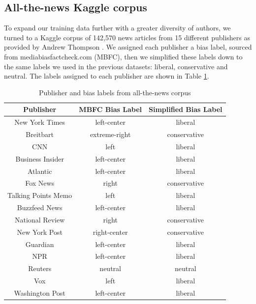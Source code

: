 \documentclass[10pt,a4paper,onecolumn]{article}
\begin{document}
\subsection{All-the-news Kaggle corpus}
To expand our training data further with a greater diversity of authors, we turned to a Kaggle corpus of 142,570 news articles from 15 different publishers as provided by Andrew Thompson \cite{news}. We assigned each publisher a bias label, sourced from mediabiasfactcheck.com (MBFC), then we simplified these labels down to the same labels we used in the previous datasets: liberal, conservative and neutral. The labels assigned to each publisher are shown in Table \ref{tab:pub-bias}.

\begin{table}[h!]
	\begin{center}
		\caption{Publisher and bias labels from all-the-news corpus}
		\label{tab:pub-bias}
		\begin{tabular}{c|c|c}
			\hline\hline
			\textbf{Publisher} & \textbf{MBFC Bias Label} & \textbf{Simplified Bias Label} \\
			\hline
			New York Times & left-center & liberal \\
			\rowcolor{Gray}
			Breitbart & extreme-right & conservative \\
			\rowcolor{Gray}
			CNN & left & liberal \\
			Business Insider & left-center & liberal \\
			Atlantic & left-center & liberal \\
			\rowcolor{Gray}
			Fox News & right & conservative \\
			\rowcolor{Gray}
			Talking Points Memo & left & liberal \\
			Buzzfeed News & left-center & liberal \\
			National Review & right & conservative \\
			New York Post & right-center & conservative \\
			Guardian & left-center & liberal \\
			NPR & left-center & liberal \\
			Reuters & neutral & neutral \\
			\rowcolor{Gray}
			Vox & left & liberal \\
			Washington Post & left-center & liberal \\
			\hline\hline
		\end{tabular}
	\end{center}
\end{table}
\end{document}
